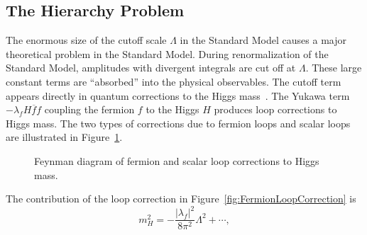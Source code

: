 \subsection{The Hierarchy Problem}
The enormous size of the cutoff scale $\Lambda$ in the Standard Model causes a
major theoretical problem in the Standard Model.  During renormalization of the
Standard Model, amplitudes with divergent integrals are cut off at $\Lambda$.
These large constant terms are ``absorbed'' into the physical observables.  The
cutoff term appears directly in quantum corrections to the Higgs
mass~\cite{Martin:1997um}.  The Yukawa term $-\lambda_f H \overline f f$
coupling the fermion $f$ to the Higgs $H$ produces loop corrections to Higgs
mass.  The two types of corrections due to fermion loops and scalar loops are
illustrated in Figure~\ref{fig:HiggsMassLoopCorrections}.
\begin{figure}
  \centering
  \hspace{15mm}
  \caption[Loop corrections to Higgs mass]{Feynman diagram of
  fermion  and scalar
   loop corrections to Higgs mass.}
  \label{fig:HiggsMassLoopCorrections}
\end{figure}
The contribution of the loop correction in
Figure~\ref{fig:FermionLoopCorrection} is~\cite{Matrin:1997um} 
\begin{equation}
  m^2_H = -\frac{|\lambda_f|^2}{8 \pi^2} \Lambda^2 + \cdots,
  \label{eq:HiggsMassCorrection}
\end{equation}
